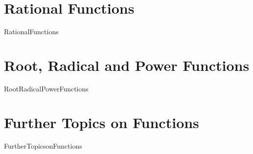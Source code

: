 \chapter{Rational Functions}
\label{RationalFunctions}
\thispagestyle{empty}
{RationalFunctions}

\chapter{Root, Radical and Power Functions}
\label{RootRadicalPowerFunctions}
\thispagestyle{empty}
{RootRadicalPowerFunctions}

\chapter{Further Topics on Functions}
\label{FurtherTopicsonFunctions}
\thispagestyle{empty}
{FurtherTopicsonFunctions}






